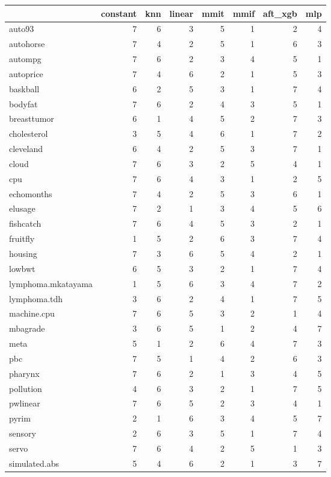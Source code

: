 \documentclass[12pt]{article}
\begin{document}
\begin{table}[!ht]
\centering
\small
\begin{tabular}{lrrrrrrr}
\toprule
 & constant & knn & linear & mmit & mmif & aft\_xgb & mlp \\
\midrule
auto93 & 7 & 6 & 3 & 5 & 1 & 2 & 4 \\
autohorse & 7 & 4 & 2 & 5 & 1 & 6 & 3 \\
autompg & 7 & 6 & 2 & 3 & 4 & 5 & 1 \\
autoprice & 7 & 4 & 6 & 2 & 1 & 5 & 3 \\
baskball & 6 & 2 & 5 & 3 & 1 & 7 & 4 \\
bodyfat & 7 & 6 & 2 & 4 & 3 & 5 & 1 \\
breasttumor & 6 & 1 & 4 & 5 & 2 & 7 & 3 \\
cholesterol & 3 & 5 & 4 & 6 & 1 & 7 & 2 \\
cleveland & 6 & 4 & 2 & 5 & 3 & 7 & 1 \\
cloud & 7 & 6 & 3 & 2 & 5 & 4 & 1 \\
cpu & 7 & 6 & 4 & 3 & 1 & 2 & 5 \\
echomonths & 7 & 4 & 2 & 5 & 3 & 6 & 1 \\
elusage & 7 & 2 & 1 & 3 & 4 & 5 & 6 \\
fishcatch & 7 & 6 & 4 & 5 & 3 & 2 & 1 \\
fruitfly & 1 & 5 & 2 & 6 & 3 & 7 & 4 \\
housing & 7 & 3 & 6 & 5 & 4 & 2 & 1 \\
lowbwt & 6 & 5 & 3 & 2 & 1 & 7 & 4 \\
lymphoma.mkatayama & 1 & 5 & 6 & 3 & 4 & 7 & 2 \\
lymphoma.tdh & 3 & 6 & 2 & 4 & 1 & 7 & 5 \\
machine.cpu & 7 & 6 & 5 & 3 & 2 & 1 & 4 \\
mbagrade & 3 & 6 & 5 & 1 & 2 & 4 & 7 \\
meta & 5 & 1 & 2 & 6 & 4 & 7 & 3 \\
pbc & 7 & 5 & 1 & 4 & 2 & 6 & 3 \\
pharynx & 7 & 6 & 2 & 1 & 3 & 4 & 5 \\
pollution & 4 & 6 & 3 & 2 & 1 & 7 & 5 \\
pwlinear & 7 & 6 & 5 & 2 & 3 & 4 & 1 \\
pyrim & 2 & 1 & 6 & 3 & 4 & 5 & 7 \\
sensory & 2 & 6 & 3 & 5 & 1 & 7 & 4 \\
servo & 7 & 6 & 4 & 2 & 5 & 1 & 3 \\
simulated.abs & 5 & 4 & 6 & 2 & 1 & 3 & 7 \\

\end{tabular}
\end{table}
\end{document}
